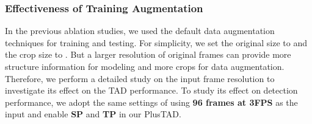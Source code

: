 \documentclass[a4paper,fleqn]{cas-dc}
\begin{document}
\begin{table*}[t]
\centering
\small
\caption{\textbf{Ablation study results on testing augmentation on THUMOS14~\citep{THUMOS14}.} 
For ThreeCrop and Flip augmentation, we fuse the features after the neck. For backward augmentation, we fuse the detection results in the post-processing phase. 
}
\label{table:test-augmentation-method}
\setlength\tabcolsep{2.8mm}
\end{table*}

\subsubsection{Effectiveness of Training Augmentation}
In the previous ablation studies, we used the default data augmentation techniques for training and testing.
For simplicity, we set the original size to  and the crop size to . 
But a larger resolution of original frames can provide more structure information for modeling and more crops for data augmentation.
Therefore, we perform a detailed study on the input frame resolution to investigate its effect on the TAD performance.
To study its effect on detection performance, we adopt the same settings of using \textbf{96 frames at 3FPS} as the input and enable \textbf{SP} and \textbf{TP} in our PlusTAD.
\end{document}
